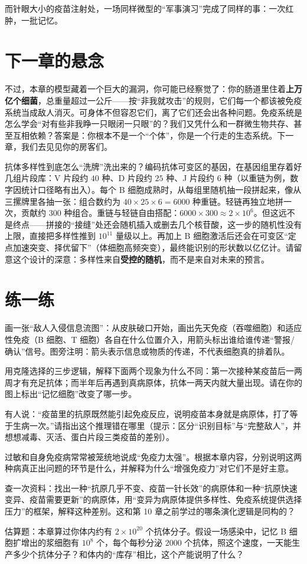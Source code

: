 而针眼大小的疫苗注射处，一场同样微型的“军事演习”完成了同样的事：一次红肿，一批记忆。

\section{下一章的悬念}

不过，本章的模型藏着一个巨大的漏洞，你可能已经察觉了：你的肠道里住着\textbf{上万亿个细菌}，总重量超过一公斤——按“非我就攻击”的规则，它们每一个都该被免疫系统当成敌人消灭。可身体不但容忍它们，离了它们还会出各种问题。免疫系统是怎么学会“对有些非我睁一只眼闭一只眼”的？我们又凭什么和一群微生物共存、甚至互相依赖？答案是：你根本不是一个“个体”，你是一个行走的生态系统。下一章，我们去见见你的房客们。

\begin{tiaozhan}
抗体多样性到底怎么“洗牌”洗出来的？编码抗体可变区的基因，在基因组里存着好几组片段库：V 片段约 $40$ 种、D 片段约 $25$ 种、J 片段约 $6$ 种（以重链为例，数字因统计口径略有出入）。每个 B 细胞成熟时，从每组里随机抽一段拼起来，像从三摞牌里各抽一张：组合数约为 $40\times 25\times 6=6000$ 种重链。轻链再独立地拼一次，贡献约 $300$ 种组合。重链与轻链自由搭配：$6000\times 300\approx 2\times 10^{6}$。但这远不是终点——拼接的“接缝”处还会随机插入或删去几个核苷酸，这一步的随机性没有上限，直接把多样性推到 $10^{11}$ 量级以上。再加上 B 细胞激活后还会在可变区“定点加速突变、择优留下”（体细胞高频突变），最终能识别的形状数以亿亿计。请留意这个设计的深意：多样性来自\textbf{受控的随机}，而不是来自对未来的预言。
\end{tiaozhan}

\section*{练一练}

\begin{sikaoti}
\item 画一张“敌人入侵信息流图”：从皮肤破口开始，画出先天免疫（吞噬细胞）和适应性免疫（B 细胞、T 细胞）各自在什么位置介入，用箭头标出谁给谁传递“警报/确认”信号。图旁注明：箭头表示信息或物质的传递，不代表细胞真的排着队。
\item 用克隆选择的三步逻辑，解释下面两个现象为什么不同：第一次接种某疫苗后一两周才有充足抗体；而半年后再遇到真病原体，抗体一两天内就大量出现。请在你的图上标出“记忆细胞”改变了哪一步。
\item 有人说：“疫苗里的抗原既然能引起免疫反应，说明疫苗本身就是病原体，打了等于生病一次。”请指出这个推理错在哪里（提示：区分“识别目标”与“完整敌人”，并想想减毒、灭活、蛋白片段三类疫苗的差别）。
\item 过敏和自身免疫病常常被笼统地说成“免疫力太强”。根据本章内容，分别说明这两种病真正出问题的环节是什么，并解释为什么“增强免疫力”对它们不是好主意。
\item 查一次资料：找出一种“抗原几乎不变、疫苗一针长效”的病原体和一种“抗原快速变异、疫苗需要更新”的病原体，用“变异为病原体提供多样性、免疫系统提供选择压力”的框架，解释这种差别。这和第 10 章之前学过的哪条演化逻辑是同构的？
\item 估算题：本章算过你体内约有 $2\times 10^{20}$ 个抗体分子。假设一场感染中，记忆 B 细胞扩增出的浆细胞有 $10^{8}$ 个，每个每秒分泌 $2000$ 个抗体，照这个速度，一天能生产多少个抗体分子？和体内的“库存”相比，这个产能说明了什么？
\end{sikaoti}
